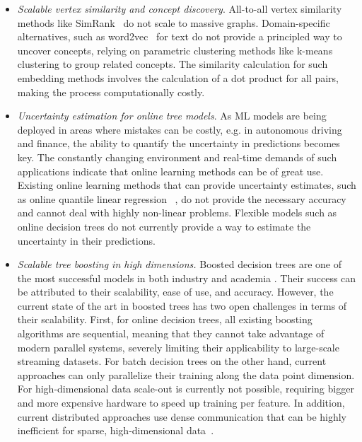 \begin{itemize}
	\item \emph{Scalable vertex similarity and concept discovery}. All-to-all vertex similarity
	methods like SimRank~\cite{simrank} do not scale to massive graphs. Domain-specific alternatives,
	such as word2vec~\cite{word2vec} for text do not provide a principled way to uncover
	concepts, relying on parametric clustering methods like k-means clustering to group related
	concepts. The similarity calculation for such embedding methods involves the
	calculation of a dot product for all pairs, making the process
	computationally costly.

	\item \emph{Uncertainty estimation for online tree models}. As ML models are being
	deployed in areas where mistakes can be costly, e.g. in autonomous driving and finance,
	the ability to quantify the uncertainty in predictions becomes key. The constantly
	changing environment and real-time demands of such applications indicate that
	online learning methods can be of great use. Existing online learning
	methods that can provide uncertainty estimates, such as online quantile linear regression
	~\cite{koenker2005qr}, do not provide the necessary accuracy and cannot deal
	with highly non-linear problems. Flexible models such as online decision trees
	do not currently provide a way to estimate the uncertainty in their predictions.

	\item \emph{Scalable tree boosting in high dimensions.} Boosted
	decision trees are one of the most successful models in both industry and academia
	\cite{xgboost, ctr-facebook, mcrank}.
	Their success can be attributed to their scalability, ease of use, and accuracy.
	However, the current state of the art in boosted trees has two open challenges
	in terms of their scalability.
	First, for online decision trees, all existing boosting algorithms are sequential,
	meaning that they cannot take advantage of modern parallel systems, severely limiting
	their applicability to large-scale streaming datasets. For batch decision trees on the other
	hand, current approaches can only parallelize their training along the data point
	dimension. For high-dimensional data scale-out is currently not possible,
	requiring bigger and more expensive hardware to speed up training per feature.
	In addition, current distributed approaches use dense communication that can
	be highly inefficient for sparse, high-dimensional data~\cite{xgboost, lightgbm}.
\end{itemize}

